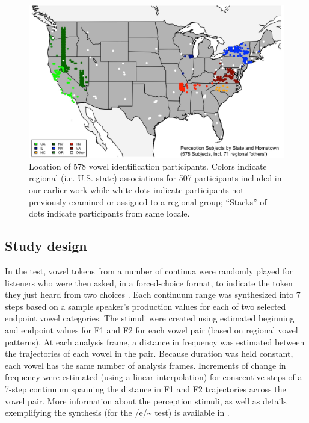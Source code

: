\documentclass[output=paper]{LSP/langsci}
\begin{document}
\begin{figure}
\includegraphics[width=\textwidth]{illustrations/kend_frid_fig1}
\caption{Location of 578 vowel identification participants. Colors indicate regional (i.e. U.S. state) associations for 507 participants included in our earlier work while white dots indicate participants not previously examined or assigned to a regional group; ``Stacks'' of dots indicate participants from same locale.}
\label{fig:1}
\end{figure}

\subsection{Study design}
In the test, vowel tokens from a number of continua were randomly played for listeners who were then asked, in a forced-choice format, to indicate the token they just heard from two choices \citep{strange_cross-language_1995,thomas_sociophonetic_2002}. Each continuum range was synthesized into 7 steps based on a sample speaker’s production values for each of two selected endpoint vowel categories. The stimuli were created using estimated beginning and endpoint values for F1 and F2 for each vowel pair (based on regional vowel patterns). At each analysis frame, a distance in frequency was estimated between the trajectories of each vowel in the pair. Because duration was held constant, each vowel has the same number of analysis frames. Increments of change in frequency were estimated (using a linear interpolation) for consecutive steps of a 7-step continuum spanning the distance in F1 and F2 trajectories across the vowel pair. More information about the perception stimuli, as well as details exemplifying the synthesis (for the /e/\~{}
test) is available in \citet{fridland_exploring_2012}.
\end{document}
